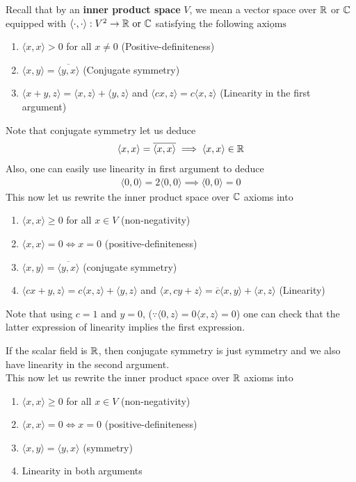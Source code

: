 \documentclass{report}
\begin{document}
\begin{mdframed}
Recall that by an \textbf{inner product space} $V$, we mean a vector space over  $\mathbb{R}$ or $\mathbb{C}$ equipped with  $\langle \cdot,\cdot\rangle : V^2 \rightarrow \mathbb{R}\text{ or }\mathbb{C}$ satisfying the following $\underline{\text{axioms}}$
\begin{enumerate}[label=(\alph*)]
  \item $\langle x,x\rangle >0$ for all $x\neq 0$ (Positive-definiteness)
  \item $\langle x,y\rangle =\overline{\langle y,x\rangle }$ (Conjugate symmetry)
  \item $\langle x+y,z\rangle =\langle x,z\rangle +\langle y,z\rangle $ and $\langle cx,z\rangle=c\langle x,z\rangle $ (Linearity in the first argument)
\end{enumerate}
Note that conjugate symmetry let us deduce
\begin{align*}
\langle x,x\rangle =\overline{\langle x,x\rangle }\implies \langle x,x\rangle \in\mathbb{R}
\end{align*}
Also, one can easily use linearity in first argument to deduce 
\begin{align*}
\langle 0,0\rangle =2\langle 0,0\rangle \implies \langle 0,0\rangle =0
\end{align*}
This now let us rewrite the inner product space over $\mathbb{C}$ axioms into 
\begin{enumerate}[label=(\alph*)]
  \item $\langle x,x\rangle \geq 0$ for all $x\in V$ (non-negativity) 
  \item $\langle x,x\rangle =0 \iff x=0$ (positive-definiteness)
  \item $\langle x,y\rangle =\overline{\langle y,x\rangle }$ (conjugate symmetry)
  \item $\langle cx+y,z\rangle =c\langle x,z\rangle +\langle y,z\rangle $ and $\langle x,cy+z\rangle =\overline{c}\langle x,y\rangle +\langle x,z\rangle $ (Linearity)
\end{enumerate}
Note that using $c=1$ and $y=0$, ($\because \langle 0,z\rangle =0\langle x,z\rangle=0 $) one can check that the latter expression of linearity implies the first expression.
\end{mdframed}
\begin{mdframed}
If the scalar field is $\mathbb{R}$, then conjugate symmetry is just symmetry and we also have linearity in the second argument.\\

This now let us rewrite the inner product space over $\mathbb{R}$ axioms into 
\begin{enumerate}[label=(\alph*)]
  \item $\langle x,x\rangle \geq 0$ for all $x\in V$ (non-negativity) 
  \item $\langle x,x\rangle =0 \iff x=0$ (positive-definiteness)
  \item $\langle x,y\rangle =\langle y,x\rangle $ (symmetry)
  \item Linearity in both arguments
\end{enumerate}
\end{mdframed}
\end{document}
